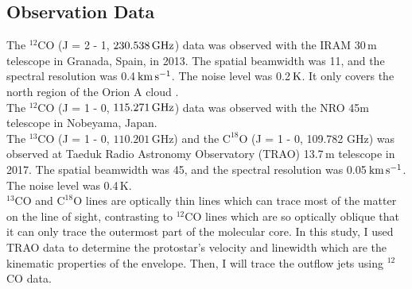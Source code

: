\subsection{Observation Data}
The $^{12}$CO (J = 2 - 1, $230.538\,\rm GHz$) data was observed with the IRAM 30$\,$m telescope in Granada, Spain, in 2013. The spatial beamwidth was 11\textacutedbl, and the spectral resolution was 0.4$\, \rm km\,s^{-1}$. The noise level was 0.2$\, \rm K$. It only covers the north region of the Orion A cloud \cite{berne2014iram}. \\
The $^{12}$CO (J = 1 - 0, $115.271\, \rm GHz$) data was observed with the NRO 45m telescope in Nobeyama, Japan.  \\
The $^{13}$CO (J = 1 - 0, $110.201\,$GHz) and the $\textrm{C}^{18}\textrm{O}$ (J = 1 - 0, 109.782 GHz) was observed at Taeduk Radio Astronomy Observatory (TRAO) 13.7$\,$m telescope in 2017. The spatial beamwidth was 45\textacutedbl, and the spectral resolution was 0.05$\, \rm km\,s^{-1}$. The noise level was 0.4$\,$K.\\
$^{13}$CO and $\textrm{C}^{18}\textrm{O}$ lines are optically thin lines which can trace most of the matter on the line of sight, contrasting to $^{12}$CO lines which are so optically oblique that it can only trace the outermost part of the molecular core. In this study, I used TRAO data to determine the protostar's velocity and linewidth which are the kinematic properties of the envelope. Then, I will trace the outflow jets using $^{12}$CO data.
